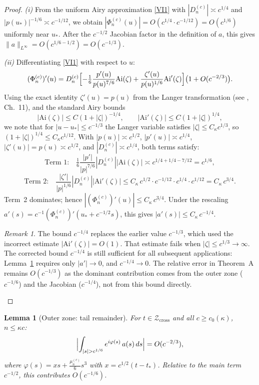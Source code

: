 \documentclass[12pt,a4paper]{amsart}
\newtheorem{lemma}[theorem]{Lemma}
\theoremstyle{definition}
\theoremstyle{remark}
\newtheorem*{remark*}{Remark}
\newcommand{\Ai}{\mathrm{Ai}}
\newcommand{\ustar}{u_*}
\newcommand{\Zcross}{\mathcal{Z}_{\mathrm{cross}}}
\newcommand{\tstar}{t_*}
\begin{document}
\begin{proof}
\textit{(i)} From the uniform Airy approximation
\eqref{VI1} with $|D_n^{(c)}| \asymp c^{1/4}$
and $|p(\ustar)|^{-1/6} \asymp c^{-1/12}$,
we obtain
$|\Phi_n^{(c)}(u)| = O(c^{1/4} \cdot c^{-1/12}) = O(c^{1/6})$
uniformly near $\ustar$.
After the $c^{-1/2}$ Jacobian factor in the definition of $a$,
this gives $\|a\|_{L^\infty} = O(c^{1/6-1/2}) = O(c^{-1/3})$.

\textit{(ii)} Differentiating \eqref{VI1} with respect to $u$:
\[
  (\Phi_n^{(c)})'(u)
  = D_n^{(c)}\Bigl[
    -\tfrac{1}{6}\frac{p'(u)}{p(u)^{7/6}}\Ai(\zeta)
    + \frac{\zeta'(u)}{p(u)^{1/6}}\Ai'(\zeta)
  \Bigr]\bigl(1 + O(c^{-2/3})\bigr).
\]
Using the exact identity $\zeta'(u) = p(u)$
from the Langer transformation
(see \cite{Olver1974}, Ch.~11),
and the standard Airy bounds
\[
  |\Ai(\zeta)| \le C(1+|\zeta|)^{-1/4},
  \qquad
  |\Ai'(\zeta)| \le C(1+|\zeta|)^{1/4},
\]
we note that for $|u - \ustar| \le c^{-1/3}$
the Langer variable satisfies
$|\zeta| \le C_\kappa c^{1/3}$,
so $(1+|\zeta|)^{1/4} \le C_\kappa c^{1/12}$.
With $|p(u)| \asymp c^{1/2}$,
$|p'(u)| \asymp c^{1/4}$,
$|\zeta'(u)| = p(u) \asymp c^{1/2}$,
and $|D_n^{(c)}| \asymp c^{1/4}$,
both terms satisfy:
\[
\text{Term 1:}\quad
\tfrac{1}{6}\frac{|p'|}{|p|^{7/6}}|D_n^{(c)}||\Ai(\zeta)|
\asymp c^{1/4+1/4-7/12} = c^{1/6},
\]
\[
\text{Term 2:}\quad
\frac{|\zeta'|}{|p|^{1/6}}|D_n^{(c)}||\Ai'(\zeta)|
\le C_\kappa\, c^{1/2} \cdot c^{-1/12} \cdot c^{1/4} \cdot c^{1/12}
= C_\kappa\, c^{3/4}.
\]
Term~2 dominates; hence
$|(\Phi_n^{(c)})'(u)| \le C_\kappa\,c^{3/4}$.
Under the rescaling
$a'(s) = c^{-1}(\Phi_n^{(c)})'(\ustar + c^{-1/2}s)$,
this gives $|a'(s)| \le C_\kappa\,c^{-1/4}$.

\begin{remark*}
The bound $c^{-1/4}$ replaces the earlier value
$c^{-1/3}$, which used the incorrect estimate
$|\Ai'(\zeta)| = O(1)$.
That estimate fails when $|\zeta| \le c^{1/3} \to \infty$.
The corrected bound $c^{-1/4}$ is still sufficient
for all subsequent applications: Lemma~\ref{lem:remainder}
requires only $|a'| \to 0$, and $c^{-1/4} \to 0$.
The relative error in Theorem~A remains $O(c^{-1/3})$
as the dominant contribution comes from the outer zone
($c^{-1/6}$) and the Jacobian ($c^{-1/4}$),
not from this bound directly.
\end{remark*}
\end{proof}

\begin{lemma}[Outer zone: tail remainder]
\label{lem:remainder}
For $t \in \Zcross$ and all $c \ge c_0(\kappa)$,
$n \le \kappa c$:
\[
  \Bigl|\int_{|s| > c^{1/6}}
  e^{i\varphi(s)}\,a(s)\,ds\Bigr|
  = O(c^{-2/3}),
\]
where $\varphi(s) = xs + \tfrac{\mu_n^{(c)}}{6}s^3$
with $x = c^{1/2}(t - \tstar)$.
Relative to the main term $c^{-1/2}$,
this contributes $O(c^{-1/6})$.
\end{lemma}
\end{document}
